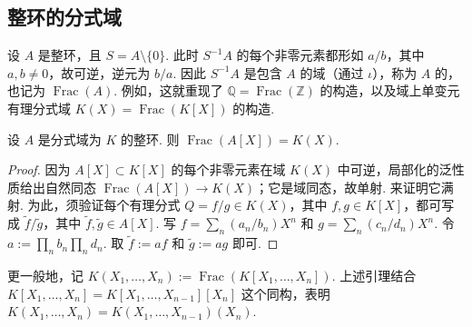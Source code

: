 \subsection{整环的分式域}\label{sec:galois-1-6-3}
设 $A$ 是整环，且 $S=A\setminus\{0\}$. 此时 $S^{-1}A$ 的每个非零元素都形如 $a/b$，其中 $a,b\ne0$，故可逆，逆元为 $b/a$. 因此 $S^{-1}A$ 是包含 $A$ 的域（通过 $\iota$），称为 $A$ 的，也记为 $\operatorname{Frac}(A)$. 例如，这就重现了 $\mathbb Q=\operatorname{Frac}(\mathbb Z)$ 的构造，以及域上单变元有理分式域 $K(X)=\operatorname{Frac}(K[X])$ 的构造.
\begin{lemma*}
设 $A$ 是分式域为 $K$ 的整环. 则 $\operatorname{Frac}(A[X])=K(X)$.
\end{lemma*}
\begin{proof}
因为 $A[X]\subset K[X]$ 的每个非零元素在域 $K(X)$ 中可逆，局部化的泛性质给出自然同态 $\operatorname{Frac}(A[X])\longrightarrow K(X)$；它是域同态，故单射. 来证明它满射. 为此，须验证每个有理分式 $Q=f/g\in K(X)$，其中 $f,g\in K[X]$，都可写成 $\widetilde f/\widetilde g$，其中 $\widetilde f,\widetilde g\in A[X]$. 写 $f=\sum_n(a_n/b_n)X^n$ 和 $g=\sum_n(c_n/d_n)X^n$. 令 $a:=\prod_n b_n\prod_n d_n$. 取 $\widetilde f:=af$ 和 $\widetilde g:=ag$ 即可.
\end{proof}
更一般地，记 $K(X_1,\ldots,X_n):=\operatorname{Frac}(K[X_1,\ldots,X_n])$. 上述引理结合 $K[X_1,\ldots,X_n]=K[X_1,\ldots,X_{n-1}][X_n]$ 这个同构，表明 $K(X_1,\ldots,X_n)=K(X_1,\ldots,X_{n-1})(X_n)$.

